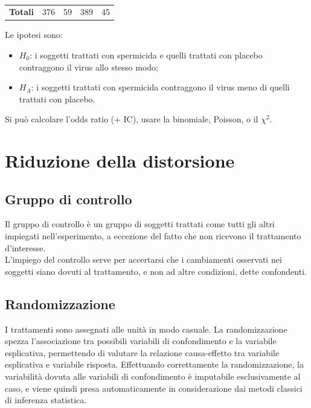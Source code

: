 \documentclass[10pt, draft]{book}
\newcommand{\tightlist}{%
\setlength{\itemsep}{1pt}\setlength{\parskip}{0pt}\setlength{\parsep}{0pt}}
\newcounter{example}[section]
\begin{document}
\begin{example}
\begin{table}[H]
\begin{tabular}{c||c|c|c|c}
        \hline
        \hline
        \textbf{Totali} & 376 & 59 & 389 & 45\\
        \end{tabular}
        \caption{\small{}}
        \label{tabhiv}
    \end{table}\noindent
    Le ipotesi sono:
    \begin{itemize} \tightlist
        \item $H_0$: i soggetti trattati con spermicida e quelli trattati con placebo contraggono il virus allo stesso modo;
        \item $H_A$: i soggetti trattati con spermicida contraggono il virus meno di quelli trattati con placebo.
    \end{itemize}
    Si può calcolare l'odds ratio (+ IC), usare la binomiale, Poisson, o il $\chi^2$.
\end{example}

\section{Riduzione della distorsione}

\subsection{Gruppo di controllo}

Il gruppo di controllo è un gruppo di soggetti trattati come tutti gli altri impiegati nell'esperimento, a eccezione del fatto che non ricevono il trattamento d'interesse.\\
L'impiego del controllo serve per accertarsi che i cambiamenti osservati nei soggetti siano dovuti al trattamento, e non ad altre condizioni, dette confondenti.

\subsection{Randomizzazione}

I trattamenti sono assegnati alle unità in modo casuale. La randomizzazione spezza l'associazione tra possibili variabili di confondimento e la variabile esplicativa, permettendo di valutare la relazione causa-effetto tra variabile esplicativa e variabile risposta. Effettuando correttamente la randomizzazione, la variabilità dovuta alle variabili di confondimento è imputabile esclusivamente al caso, e viene quindi presa automaticamente in considerazione dai metodi classici di inferenza statistica.
\end{document}
